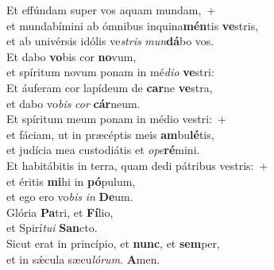 \evenverse Et effúndam super vos aquam mundam,~+\\\evenverse  et mundabímini ab ómnibus inquina\textbf{mén}tis \textbf{ve}stris,~\*\\
\evenverse et ab univérsis idólis ve\textit{stris} \textit{mun}\textbf{dá}bo vos.\\
\oddverse Et dabo \textbf{vo}bis cor \textbf{no}vum,~\*\\
\oddverse et spíritum novum ponam in mé\textit{di}\textit{o} \textbf{ve}stri:\\
\evenverse Et áuferam cor lapídeum de \textbf{car}ne \textbf{ve}stra,~\*\\
\evenverse et dabo vo\textit{bis} \textit{cor} \textbf{cár}neum.\\
\oddverse Et spíritum meum ponam in médio vestri:~+\\
\oddverse  et fáciam, ut in præcéptis meis \textbf{am}bu\textbf{lé}tis,~\*\\
\oddverse et judícia mea custodiátis et \textit{o}\textit{pe}\textbf{ré}mini.\\
\evenverse Et habitábitis in terra, quam dedi pátribus vestris:~+\\
\evenverse  et éritis \textbf{mi}hi in \textbf{pó}pulum,~\*\\
\evenverse et ego ero vo\textit{bis} \textit{in} \textbf{De}um.\\
\oddverse Glória \textbf{Pa}tri, et \textbf{Fí}lio,~\*\\
\oddverse et Spirí\textit{tu}\textit{i} \textbf{San}cto.\\
\evenverse Sicut erat in princípio, et \textbf{nunc}, et \textbf{sem}per,~\*\\
\evenverse et in sǽcula sæcu\textit{ló}\textit{rum}. \textbf{A}men.\\
